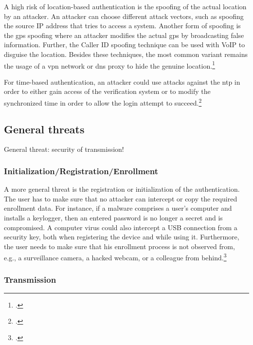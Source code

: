 A high risk of location-based authentication is the spoofing of the actual location by an attacker. An attacker can choose different attack vectors, such as spoofing the source IP address that tries to access a system. Another form of spoofing is the \gls{gps} spoofing where an attacker modifies the actual \gls{gps} by broadcasting false information. Further, the Caller ID spoofing technique can be used with VoIP to disguise the location. Besides these techniques, the most common variant remains the usage of a \gls{vpn} network or \gls{dns} proxy to hide the genuine location.\footcites[See][138--145]{517355}[See][Chapter 4.5.3]{30270}[See][115--116,133]{eckert-it-sec-9}

For time-based authentication, an attacker could use attacks against the \gls{ntp} in order to either gain access of the verification system or to modify the synchronized time in order to allow the login attempt to succeed.\footcite[See][]{malhotraattacking}

\subsection{General threats}

General threat: security of transmission!

\subsubsection{Initialization/Registration/Enrollment}

A more general threat is the registration or initialization of the authentication. The user has to make sure that no attacker can intercept or copy the required enrollment data. For instance, if a malware comprises a user’s computer and installs a keylogger, then an entered password is no longer a secret and is compromised. A computer virus could also intercept a USB connection from a security key, both when registering the device and while using it. Furthermore, the user needs to make sure that his enrollment process is not observed from, e.g., a surveillance camera, a hacked webcam, or a colleague from behind.\footcites[See][152--153]{10.1007/978-3-642-39235-1_9}[See][61]{Ulqinaku:2019:FPP:3317549.3323404}

\subsubsection{Transmission}

